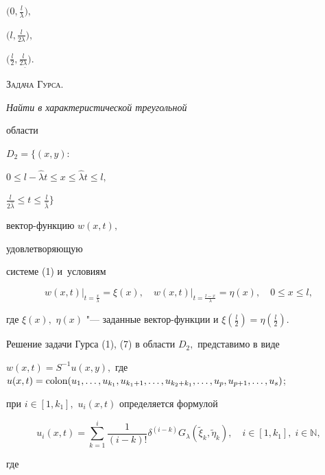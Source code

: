 $\bigl(0, \frac{l}{\lambda}\bigr),$

$\bigl(l, \frac{l}{2\lambda}\bigr),$

$\bigl(\frac{l}{2}, \frac{l}{2\underline{\lambda}}\bigr).$



\textsc{Задача Гурса.} {\it  Найти в характеристической треугольной

области 

$D_{2}=\big\{(x, y){:}$ 

$0\leqslant l-\widehat{\lambda}t

\leqslant x \leqslant \widehat{\lambda}t \leqslant l,$ 

$\frac{l}{2\widehat{\lambda}}\leqslant t \leqslant \frac{l}{\widehat{\lambda}}\big\}$  

вектор-функцию $w(x, t),$

удовлетворяющую

 системе {\rm (1)} и~условиям

 \begin{equation} 

w(x, t)\Big|_{t=\frac{x}{\lambda}}=\xi(x),\quad

w(x, t)\Big|_{t=\frac{l-x}{\lambda}}=\eta(x),\quad  0\leqslant x \leqslant l,

\end{equation}

 где $\xi(x),$ $\eta(x)$ "--- заданные  вектор-функции и $\xi(\frac{l}{2})=\eta(\frac{l}{2}).$

}



Решение задачи Гурса (1), (7) в области $D_{2},$ представимо в виде

$w(x, t)=S^{-1}u(x, y),$ где $u(x, t)={\rm colon}(u_{1}, \dots, 

u_{k_{1}}, u_{k_{1}+1}, \dots, u_{k_{2}+k_{1}}, \dots, u_{p}, u_{p+1}, \dots, u_{s})$;

при $i\in[1, k_{1}],$  $u_{i}(x, t)$ определяется формулой

\begin{equation}

u_{i}(x, t)=\sum\limits_{k=1}^{i}\frac{1}{(i-k)!}\delta^{(i-k)}G_{\lambda}(\widetilde{\xi}_{k},\widetilde{\eta}_{k}),\quad

i\in[1, k_{1}],\; i\in \mathbb N,

\end{equation}

где

$$

